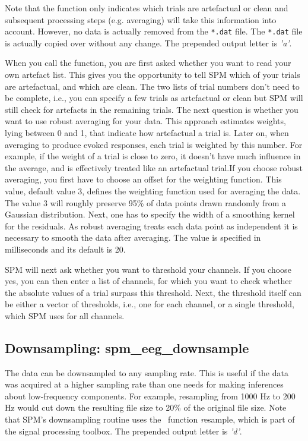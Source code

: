 Note that the function only indicates which trials are artefactual or clean and subsequent processing steps (e.g. averaging) will take this information into account. However, no data is actually removed from the \texttt{*.dat} file. The \texttt{*.dat} file is actually copied over without any change. The prepended output letter is \textit{'a'}.

When you call the function, you are first asked whether you want to read your own artefact list. This gives you the opportunity to tell SPM which of your trials are artefactual, and which are clean. The two lists of trial numbers don't need to be complete, i.e., you can specify a few trials as artefactual or clean but SPM will still check for artefacts in the remaining trials. The next question is whether you want to use robust averaging for your data. This approach estimates weights, lying between 0 and 1, that indicate how artefactual a trial is. Later on, when averaging to produce evoked responses, each trial is weighted by this number. For example, if the weight of a trial is close to zero, it doesn't have much influence in the average, and is effectively treated like an artefactual trial.If you choose robust averaging, you first have to choose an offset for the weighting function. This value, default value 3, defines the weighting function used for averaging the data. The value 3 will roughly preserve 95\% of data points drawn randomly from a Gaussian distribution. Next, one has to specify the width of a smoothing kernel for the residuals. As robust averaging treats each data point as independent it is necessary to smooth the data after averaging. The value is specified in milliseconds and its default is 20.

SPM will next ask whether you want to threshold your channels. If you choose yes, you can then enter a list of channels, for which you want to check whether the absolute values of a trial surpass this threshold. Next, the threshold itself can be either a vector of thresholds, i.e., one for each channel, or a single threshold, which SPM uses for all channels.

\subsection{Downsampling: spm\_eeg\_downsample}
The data can be downsampled to any sampling rate. This is useful if the data was acquired at a higher sampling rate than one needs for making inferences about low-frequency components. For example, resampling from 1000 Hz to 200 Hz would cut down the resulting file size to 20\% of the original file size. Note that SPM's downsampling routine uses the \matlab\ function {\textit resample}, which is part of the signal processing toolbox. The prepended output letter is \textit{'d'}.

